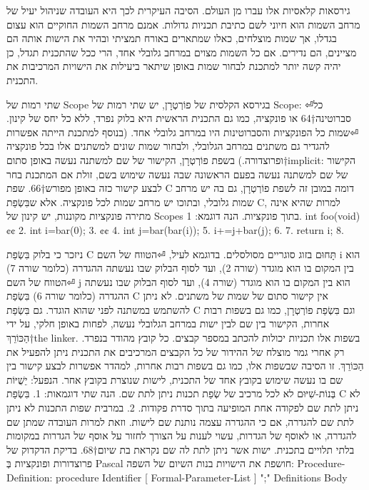 \begin{טבלא}[!htbp]
      גירסאות קלאסיות אלו עברו מן העולם. הסיבה העיקרית לכך היא העובדה שניהול
      יעיל של מרחב השמות הוא חיוני לשם כתיבת תכניות גדולות. אמנם מרחב השמות
      החוקיים הוא עצום בגדלו, אך שמות מוצלחים, כאלו שמתארים באורח תמציתי ובהיר
      את הישות אותה הם מציינים, הם נדירים. אם כל השמות מצוים במרחב גלובלי אחד,
      הרי ככל שהתכנית תגדל, כן יהיה קשה יותר למתכנת לבחור שמות באופן שיתאר
      ביעילות את הישויות המרכיבות את התכנית.

      שתי רמות של Scope
      בגירסא הקלסית של פוֹרְטְרָן, יש שתי רמות של Scope:
⏎כל סברוטינה†{64} או פונקציה, כמו גם התכנית הראשית היא בלוק נפרד, ללא כל יחס של קינון.
⏎שמות כל הפונקציות והסברוטינות היו במרחב גלובלי אחד.
      (בנוסף למתכנת הייתה אפשרות להגדיר גם משתנים במרחב הגלובלי, ולבחור שמות שונים למשתנים אלו בכל פונקציה ופרוצדורה.)
      בשפת פוֹרְטְרָן, הקישור של שם למשתנה נעשה באופן סתום†{implicit}: הקישור של שם למשתנה נעשה בפעם הראשונה שבה נעשה שימוש בשם, זולת אם המתכנת בחר לבצע קישור כזה באופן מפורש†{66}.
      שפת C דומה במובן זה לשפת פוֹרְטְרָן, גם בה יש מרחב שמות גלובלי, ובתוכו יש מרחב שמות לכל פונקציה. אלא שבִּשְׂפַת C, למרות שהיא אינה מתירה פונקציות מקוננות, יש קינון של Scopes בתוך פונקציות.
      הנה דוגמא:
      1. int foo(void) {¢¢
        2. int i=bar(0);
        3. {¢¢
          4. int j=bar(bar(i));
          5. i+=j+bar(j);
        6. }
        7. return i;
      8. }

      ניזכר כי בלוק בִּשְׂפַת C תָּחוּם בזוג סוגריים מסולסלים.
      בדוגמא לעיל,
⏎הטווח של השם i הוא בין המקום בו הוא מוגדר (שורה 2), ועד לסוף הבלוק שבו נעשתה ההגדרה (כלומר שורה 7)
⏎הטווח של השם j הוא בין המקום בו הוא מוגדר (שורה 4), ועד לסוף הבלוק שבו נעשתה ההגדרה (כלומר שורה 6)
      בִּשְׂפַת C אין קישור סתום של שמות של משתנים. לא ניתן להשתמש במשתנה לפני שהוא הוגדר.
      גם בִּשְׂפַת C וגם בִּשְׂפַת פוֹרְטְרָן, כמו גם בשפות רבות אחרות, הקישור בין שם לבין ישות במרחב הגלובלי נעשה, לפחות באופן חלקי, על ידי הַכּוֹרֵךְ†{the linker}. בשפות אלו תכניות יכולות להכתב במספר קבצים. כל קובץ מהודר בנפרד. רק אחרי גמר מוצלח של ההידור של כל הקבצים המרכיבים את התכנית ניתן להפעיל את הַכּוֹרֵךְ. זו הסיבה שבשפות אלו, כמו גם בשפות רבות אחרות, למהדר אפשרות לבצע קישור בין שם בו נעשה שימוש בקובץ אחד של התכנית, לישות שנוצרת בקובץ אחר.
      הנפעל: יֵשֻׁיּוֹת בְּנוֹת-שִׁיּוּם
      לא לכל מרכיב של שְׂפַת תכנות ניתן לתת שם. הנה שתי דוגמאות:
      1. בִּשְׂפַת C לא ניתן לתת שם לפקודה אחת המופיעה בתוך סדרת פקודות.
      2. במרבית שפות התכנות לא ניתן לתת שם להגדרה, אם כי ההגדרה עצמה נותנת שם לישות. וזאת למרות העובדה שמתן שם להגדרה, או לאוסף של הגדרות, עשוי לענות על הצורך לחזור על אוסף של הגדרות במקומות בלתי תלויים בתכנית.
      ישות אשר ניתן לתת לה שם נקראת בת שיום†{68}.
      בדיקת הדקדוק של פרוצדורות ופונקציות בְּ Pascal חושפת את הישויות בנות השיום של השפה:
      Procedure-Definition:
      procedure Identifier [ Formal-Parameter-List ] ";" Definitions Body


\end{טבלא}
